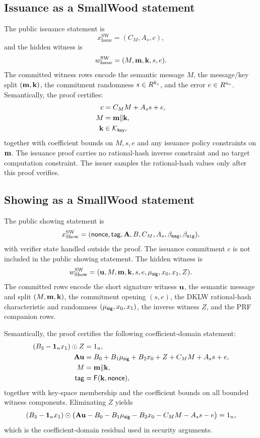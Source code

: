 \subsection{Issuance as a SmallWood statement}
\label{subsec:smallwood-issuance}
\label{subsec:presign-compiled}
The public issuance statement is
\[
  x^{\mathrm{SW}}_{\mathrm{Issue}}=(C_M,A_s,c),
\]
and the hidden witness is
\[
  w^{\mathrm{SW}}_{\mathrm{Issue}}=(M,\mathbf{m},\mathbf{k},s,e).
\]
The committed witness rows encode the semantic message \(M\), the message/key split \((\mathbf{m},\mathbf{k})\), the
commitment randomness \(s\in R^{k_s}\), and the error \(e\in R^{n_c}\).  Semantically, the proof certifies:
\begin{align*}
  c&=C_MM+A_s s+e,\\
  M&=\mathbf{m}\Vert\mathbf{k},\\
  \mathbf{k}&\in\mathcal K_{\mathsf{key}},
\end{align*}
together with coefficient bounds on \(M,s,e\) and any issuance policy constraints on \(\mathbf{m}\).  The issuance proof
carries no rational-hash inverse constraint and no target computation constraint.  The issuer samples the rational-hash
values only after this proof verifies.

\subsection{Showing as a SmallWood statement}
\label{subsec:smallwood-showing}
\label{subsec:showing-compiled}
The public showing statement is
\[
  x^{\mathrm{SW}}_{\mathrm{Show}}=(\mathsf{nonce},\mathsf{tag},\mathbf{A},B,C_M,A_s,\beta_{\mathtt{msg}},\beta_{\mathtt{sig}}),
\]
with verifier state handled outside the proof.  The issuance commitment \(c\) is not included in the public showing
statement.  The hidden witness is
\[
  w^{\mathrm{SW}}_{\mathrm{Show}}=(\mathbf{u},M,\mathbf{m},\mathbf{k},s,e,\mu_{\mathsf{sig}},x_0,x_1,Z).
\]
The committed rows encode the short signature witness \(\mathbf{u}\), the semantic message and split \((M,\mathbf{m},
\mathbf{k})\), the commitment opening \((s,e)\), the DKLW rational-hash characteristic and randomness
\((\mu_{\mathsf{sig}},x_0,x_1)\), the inverse witness \(Z\), and the PRF companion rows.

Semantically, the proof certifies the following coefficient-domain statement:
\begin{align}
  (B_3-\mathbf 1_nx_1)\odot Z&=1_n, \label{eq:sw-show-inv}\\
  \mathbf{A}\mathbf{u}&=B_0+B_1\mu_{\mathsf{sig}}+B_2x_0+Z+C_MM+A_s s+e, \label{eq:sw-show-sig}\\
  M&=\mathbf{m}\Vert\mathbf{k}, \label{eq:sw-show-encoding}\\
  \mathsf{tag}&=\mathsf{F}(\mathbf{k},\mathsf{nonce}), \label{eq:sw-show-prf}
\end{align}
together with key-space membership and the coefficient bounds on all bounded witness components.  Eliminating
\(Z\) yields
\begin{equation}
  (B_3-\mathbf 1_nx_1)\odot
  \bigl(\mathbf{A}\mathbf{u}-B_0-B_1\mu_{\mathsf{sig}}-B_2x_0-C_MM-A_s s-e\bigr)=1_n,
  \label{eq:sw-show-eliminated}
\end{equation}
which is the coefficient-domain residual used in security arguments.

